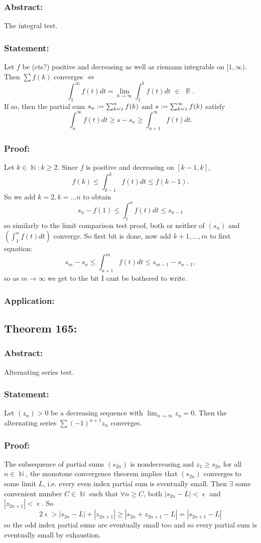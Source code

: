 \documentclass{article}
\DeclareMathOperator\eps{\epsilon}
\DeclareMathOperator\R{\mathbb{R}}
\DeclareMathOperator\N{\mathbb{N}}
\begin{document}
\subsubsection*{Abstract:}
The integral test.
\subsubsection*{Statement:}
Let $f$ be (cts?) positive and decreasing as well as riemann integrable on $[1, \infty)$.
Then $\sum f(k)$ converges $\iff$ $$
\int_1^{\infty}f(t)dt = \lim_{b \to \infty} \int_1^b f(t)dt \,\, \in \,\, \R.
$$
If so, then the partial sum $s_n \vcentcolon= \sum_{k=1}^nf(k)$ and $s \vcentcolon= \sum_{k=1}^{\infty}f(k)$ satisfy
$$
\int_{n}^{\infty}f(t)dt \geq s- s_n \geq \int_{n+1}^{\infty}f(t)dt.
$$
\subsubsection*{Proof:}
Let $k \in \N:k \geq 2$. Since $f$ is positive and decreasing on $[k-1,k]$,
$$f(k) \leq \int_{k-1}^{k}f(t)dt \leq f(k-1).$$
So we add $k=2,k=...n$ to obtain
$$
s_n - f(1) \leq \int_{1}^nf(t)dt \leq s_{n-1}
$$
so similarly to the limit comparison test proof, both or neither of $(s_n)$
and $(\int_1^n f(t)dt)$ converge. So first bit is done, now add $k+1,...,m$ to first equation: $$
s_m-s_n \leq \int_{n+1}^m f(t)dt \leq s_{m-1}-s_{n-1},
$$
so as $m \to \infty$ we get to the bit I cant be bothered to write.
\subsubsection*{Application:}

\subsection{Theorem 165:}
\subsubsection*{Abstract:}
Alternating series test.
\subsubsection*{Statement:}
Let $(z_n)>0$ be a decreasing sequence with $\lim_{n \to \infty}z_n = 0$. Then
the alternating series $\sum (-1)^{n+1}z_n$ converges.
\subsubsection*{Proof:}
The subsequence of partial sums $(s_{2n})$ is nondecreasing and
$z_1 \geq s_{2n}$ for all $n \in \N$, the monotone convergence theorem implies that
$(s_{2n})$ converges to some limit $L$, i.e. every even index partial sum is eventually small. Then $\exists$ some convenient number
$C \in \N$ such that $\forall n \geq C$, both $|s_{2n}-L|< \eps$ and $|z_{2n+1}|< \eps$. So $$
2 \eps > |s_{2n}-L| + |z_{2n+1}| \geq |s_{2n}+z_{2n+1}-L| = |s_{2n+1}-L|
$$
so the odd index partial sums are eventually small too and so every partial
sum is eventually small by exhaustion.
\end{document}
